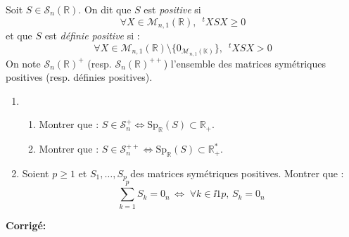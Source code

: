 \documentclass[a4paper,twoside,french,11pt]{VcCours}
\newcommand{\corr}{\textbf{Corrigé:}}
\begin{document}
\begin{Exercice}{} Soit $S \in \mathcal{S}_n(\mathbb{R})$. On dit que $S$ est \textit{positive} si
$$ \forall X \in \mathcal{M}_{n,1}(\mathbb{R}), \; ~^tX S X \geq 0$$
et que $S$ est \textit{définie positive} si :
$$ \forall X \in \mathcal{M}_{n,1}(\mathbb{R}) \setminus \lbrace 0_{\mathcal{M}_{n,1}(\mathbb{K})} \rbrace, \; ~^tX S X > 0$$
On note $\mathcal{S}_n(\mathbb{R})^+$ (resp. $\mathcal{S}_n(\mathbb{R})^{++}$) l'ensemble des matrices symétriques positives (resp. définies positives).

\begin{enumerate}
\item 
\begin{enumerate}
\item Montrer que : $S \in \mathcal{S}_n^+ \Longleftrightarrow \textrm{Sp}_{\mathbb{R}}(S) \subset \mathbb{R}_+$.
\item Montrer que : $S \in \mathcal{S}_n^{++} \Longleftrightarrow \textrm{Sp}_{\mathbb{R}}(S) \subset \mathbb{R}_+^{*}$.
\end{enumerate}
\item Soient $p \geq 1$ et $S_1, \ldots, S_p$ des matrices symétriques positives. Montrer que :
$$ \sum_{k=1}^p S_k = 0_n  \, \Longleftrightarrow \;  \forall k \in \ii{1}{p}, \, S_k = 0_n $$
\end{enumerate}
\end{Exercice}

\corr 
\end{document}
